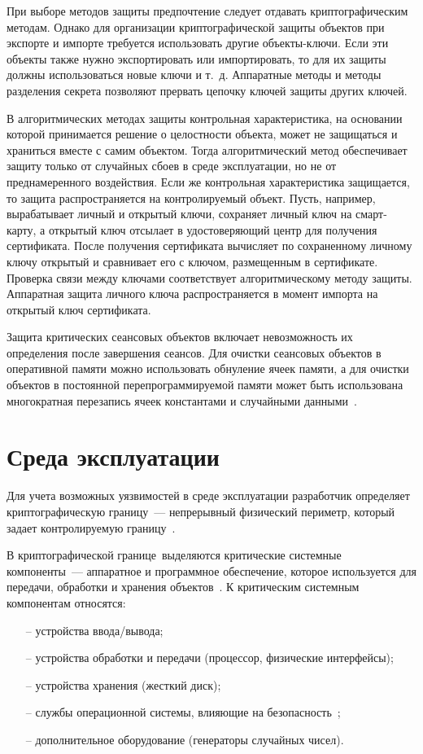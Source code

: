 При выборе методов защиты предпочтение следует отдавать 
криптографическим методам. Однако для организации криптографической защиты 
объектов при экспорте и импорте требуется использовать другие 
объекты-ключи. Если эти объекты также нужно экспортировать или 
импортировать, то для их защиты должны использоваться новые ключи
и т.~д. Аппаратные методы и методы разделения секрета позволяют
прервать цепочку ключей защиты других ключей.

В алгоритмических методах защиты контрольная характеристика, 
на основании которой принимается решение о целостности объекта, 
может не защищаться и храниться вместе с самим объектом.
Тогда алгоритмический метод обеспечивает защиту только от случайных сбоев 
в среде эксплуатации, но не от преднамеренного воздействия. 
%
Если же контрольная характеристика защищается, то защита распространяется
на контролируемый объект. 
%
Пусть, например, \TOE вырабатывает личный и открытый ключи,
сохраняет личный ключ на смарт-карту, 
а открытый ключ отсылает в удостоверяющий центр для получения сертификата. 
%
После получения сертификата \TOE вычисляет по сохраненному личному ключу 
открытый и сравнивает его с ключом, размещенным в сертификате.
%
Проверка связи между ключами соответствует алгоритмическому методу защиты.
Аппаратная защита личного ключа распространяется в момент импорта
на открытый ключ сертификата. 

Защита критических сеансовых объектов включает невозможность 
их определения после завершения сеансов.
Для очистки сеансовых объектов в оперативной памяти можно использовать 
обнуление ячеек памяти,
а для очистки объектов в постоянной перепрограммируемой памяти 
может быть использована многократная перезапись ячеек 
константами и случайными данными~.

\section{Среда эксплуатации}

Для учета возможных уязвимостей в среде эксплуатации 
разработчик определяет криптографическую границу~---
непрерывный физический периметр, 
который задает контролируемую границу~\TOE.

В криптографической границе~\TOE выделяются
критические системные компоненты~--- 
аппаратное и программное обеспечение, которое используется
для передачи, обработки и хранения объектов~\TOE.
К критическим системным компонентам относятся:
\begin{itemize}
\item[--]
устройства ввода/вывода;

\item[--]
устройства обработки и передачи (процессор, физические интерфейсы);

\item[--]
устройства хранения (жесткий диск);

\item[--]
службы операционной системы, влияющие на безопасность~\TOE;

\item[--]
дополнительное оборудование (генераторы случайных чисел).
\end{itemize}

